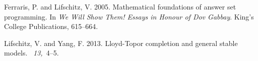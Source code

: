 \documentclass{tlp}
\begin{document}
\begin{thebibliography}{}

{\sc Ferraris, P.} {\sc and} {\sc Lifschitz, V.} 2005.
\newblock Mathematical foundations of answer set programming.
\newblock In {\em We Will Show Them! Essays in Honour of Dov Gabbay}. King's
  College Publications, 615--664.

{\sc Lifschitz, V.} {\sc and} {\sc Yang, F.} 2013.
\newblock Lloyd-{T}opor completion and general stable models.
~{\em 13,\/}~4--5.

\end{thebibliography}
\end{document}
